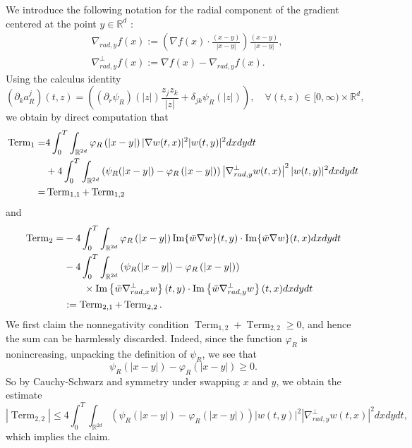 \documentclass[reqno,11pt]{amsart}
\theoremstyle{plain}
\theoremstyle{definition}
\numberwithin{equation}{section}
\numberwithin{theorem}{section}
\def\geq{\geqslant}
\def\leq{\leqslant}
\begin{document}
We introduce the following notation for the radial component of the gradient centered at the point $y \in \mathbb{R}^{d}$ :
\begin{align*}
& \nabla_{r a d, y} f(x):=\left(\nabla f(x) \cdot \frac{(x-y)}{|x-y|}\right) \frac{(x-y)}{|x-y|},  \\
& \nabla_{r a d, y}^{\perp} f(x):=\nabla f(x)-\nabla_{r a d, y} f(x) . 
\end{align*}
Using the calculus identity
\begin{equation}\label{lllk}
\left(\partial_{k} a_{R}^{j}\right)(t, z)=\left(\left(\partial_{r} \psi_{R}\right)(|z|) \frac{z_{j} z_{k}}{|z|}+\delta_{j k} \psi_{R}(|z|)\right), \quad \forall(t, z) \in[0, \infty) \times \mathbb{R}^{d}, 
\end{equation}
we obtain by direct computation that
\begin{align}\notag
\operatorname{Term}_{1}= & 4 \int_{0}^{T} \int_{\mathbb{R}^{2d}} \varphi_{R}\left(|x-y|\right)|\nabla w(t, x)|^{2}|w(t, y)|^{2} d x d y d t \\\notag
& +4 \int_{0}^{T} \int_{\mathbb{R}^{2d}} \left(\psi_{R}(|x-y|)-\varphi_{R}\left(|x-y|\right)\right)\left|\nabla_{r a d, y}^{\perp} w(t, x)\right|^{2}|w(t, y)|^{2} d x d y d t \\
= & \operatorname{Term}_{1,1}+\operatorname{Term}_{1,2}
\end{align}
and
\begin{align}\notag
\operatorname{Term}_{2}= & -4 \int_{0}^{T} \int_{\mathbb{R}^{2d}} \varphi_{R}\left(|x-y|\right) \operatorname{Im}\{\bar{w} \nabla w\}(t, y) \cdot \operatorname{Im}\{\bar{w} \nabla w\}(t, x) d x d y d t \\\notag
& -4 \int_{0}^{T} \int_{\mathbb{R}^{2d}} \left(\psi_{R}(|x-y|)-\varphi_{R}\left(|x-y|\right)\right)\notag\\
&\qquad\times \operatorname{Im}\left\{\bar{w} \nabla_{rad, x}^{\perp} w\right\}(t, y) \cdot \operatorname{Im}\left\{\bar{w} \nabla_{rad, y}^{\perp} w\right\}(t, x) d x d y d t\\
&:=\operatorname{Term}_{2,1}+\operatorname{Term}_{2,2}.
\end{align}
We first claim the nonnegativity condition $\operatorname{Term}_{1,2}+\operatorname{Term}_{2,2} \geq 0$, and hence the sum can be harmlessly discarded. Indeed, since the function $\varphi_{R}$ is nonincreasing, unpacking the definition of $\psi_{R}$, we see that
\begin{equation*}
\psi_{R}(|x-y|)-\varphi_{R}\left(|x-y|\right) \geq 0.
\end{equation*}
So by Cauchy-Schwarz and symmetry under swapping $x$ and $y$, we obtain the estimate
\begin{equation*}
\left|\operatorname{Term}_{2,2}\right| \leq 4 \int_{0}^{T} \int_{\mathbb{R}^{2d}} \left(\psi_{R}(|x-y|)-\varphi_{R}\left(|x-y|\right)\right)|w(t, y)|^{2}\left|\nabla_{r a d, y}^{\perp} w(t, x)\right|^{2} d x d y d t, 
\end{equation*}
which implies the claim.
\end{document}
